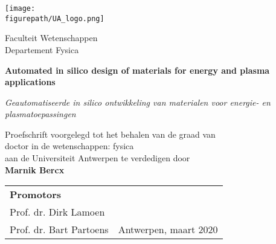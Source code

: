 \begin{titlepage}
   \begin{center}
       \vspace*{1cm}
       
       \texttt{[image: \\figurepath/UA\_logo.png]}
       
       \vspace{1cm}
         
       Faculteit Wetenschappen\\
       Departement Fysica\\
       
       \vspace{3cm}
       
       {\huge
       \textbf{Automated in silico design of materials for energy and plasma applications}
       }
 
       \vspace{0.5cm}
       \textit{Geautomatiseerde in silico ontwikkeling van materialen voor energie- en plasmatoepassingen}
 
       \vfill
       
       Proefschrift voorgelegd tot het behalen van de graad van \\
       doctor in de wetenschappen: fysica \\
       aan de Universiteit Antwerpen te verdedigen door \\
       
        \vspace{1cm}
        \textbf{Marnik Bercx}
       
       \vfill
       
       \begin{tabular}{l @{\hskip 18 em} r}
       \textbf{Promotors} \\ Prof. dr. Dirk Lamoen \\ Prof. dr. Bart Partoens
       & Antwerpen, maart 2020
       \end{tabular}
 
       \vspace{0.8cm}
 
   \end{center}
\end{titlepage}
